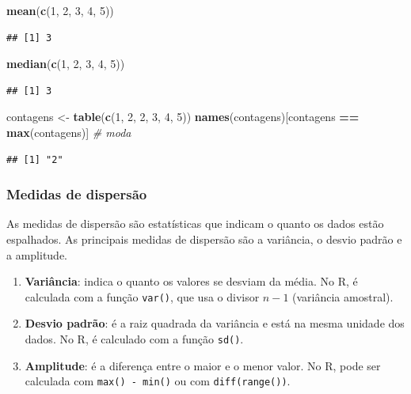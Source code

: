 \documentclass[
]{book}
\newenvironment{Shaded}{\begin{snugshade}}{\end{snugshade}}
\newcommand{\CommentTok}[1]{\textcolor[rgb]{0.56,0.35,0.01}{\textit{#1}}}
\newcommand{\DecValTok}[1]{\textcolor[rgb]{0.00,0.00,0.81}{#1}}
\newcommand{\FunctionTok}[1]{\textcolor[rgb]{0.13,0.29,0.53}{\textbf{#1}}}
\newcommand{\NormalTok}[1]{#1}
\newcommand{\OtherTok}[1]{\textcolor[rgb]{0.56,0.35,0.01}{#1}}
\newcommand{\SpecialCharTok}[1]{\textcolor[rgb]{0.81,0.36,0.00}{\textbf{#1}}}
\begin{document}
\begin{Shaded}
\begin{Highlighting}[]
\FunctionTok{mean}\NormalTok{(}\FunctionTok{c}\NormalTok{(}\DecValTok{1}\NormalTok{, }\DecValTok{2}\NormalTok{, }\DecValTok{3}\NormalTok{, }\DecValTok{4}\NormalTok{, }\DecValTok{5}\NormalTok{))}
\end{Highlighting}
\end{Shaded}

\begin{verbatim}
## [1] 3
\end{verbatim}

\begin{Shaded}
\begin{Highlighting}[]
\FunctionTok{median}\NormalTok{(}\FunctionTok{c}\NormalTok{(}\DecValTok{1}\NormalTok{, }\DecValTok{2}\NormalTok{, }\DecValTok{3}\NormalTok{, }\DecValTok{4}\NormalTok{, }\DecValTok{5}\NormalTok{))}
\end{Highlighting}
\end{Shaded}

\begin{verbatim}
## [1] 3
\end{verbatim}

\begin{Shaded}
\begin{Highlighting}[]
\NormalTok{contagens }\OtherTok{\textless{}{-}} \FunctionTok{table}\NormalTok{(}\FunctionTok{c}\NormalTok{(}\DecValTok{1}\NormalTok{, }\DecValTok{2}\NormalTok{, }\DecValTok{2}\NormalTok{, }\DecValTok{3}\NormalTok{, }\DecValTok{4}\NormalTok{, }\DecValTok{5}\NormalTok{))}
\FunctionTok{names}\NormalTok{(contagens)[contagens }\SpecialCharTok{==} \FunctionTok{max}\NormalTok{(contagens)]   }\CommentTok{\# moda}
\end{Highlighting}
\end{Shaded}

\begin{verbatim}
## [1] "2"
\end{verbatim}

\subsubsection{Medidas de dispersão}\label{medidas-de-dispersuxe3o-1}

As medidas de dispersão são estatísticas que indicam o quanto os dados estão espalhados. As principais medidas de dispersão são a variância, o desvio padrão e a amplitude.

\begin{enumerate}
\def\labelenumi{\arabic{enumi}.}
\item
  \textbf{Variância}: indica o quanto os valores se desviam da média. No R, é calculada com a função \texttt{var()}, que usa o divisor \(n - 1\) (variância amostral).
\item
  \textbf{Desvio padrão}: é a raiz quadrada da variância e está na mesma unidade dos dados. No R, é calculado com a função \texttt{sd()}.
\item
  \textbf{Amplitude}: é a diferença entre o maior e o menor valor. No R, pode ser calculada com \texttt{max()\ -\ min()} ou com \texttt{diff(range())}.
\end{enumerate}
\end{document}
